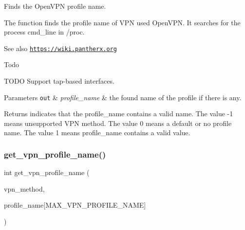 Finds the Open\+V\+PN profile name. 

The function finds the profile name of V\+PN used Open\+V\+PN. It searches for the process cmd\+\_\+line in /proc.

\begin{DoxySeeAlso}{See also}
\href{https://wiki.pantherx.org}{\tt https\+://wiki.\+pantherx.\+org} 
\end{DoxySeeAlso}
\begin{DoxyRefDesc}{Todo}
\item[\hyperlink{todo__todo000001}{Todo}]T\+O\+DO Support tap-\/based interfaces.\end{DoxyRefDesc}



\begin{DoxyParams}[1]{Parameters}
\mbox{\tt out}  & {\em profile\+\_\+name} & the found name of the profile if there is any. \\
\hline
\end{DoxyParams}
\begin{DoxyReturn}{Returns}
indicates that the profile\+\_\+name contains a valid name. The value -\/1 means unsupported V\+PN method. The value 0 means a default or no profile name. The value 1 means profile\+\_\+name contains a valid value. 
\end{DoxyReturn}
\mbox{\label{app-profile_8c_aa32bea11cb1c8f99a45bc62cc8f5e455}} 
\subsubsection{\texorpdfstring{get\+\_\+vpn\+\_\+profile\+\_\+name()}{get\_vpn\_profile\_name()}}
{\footnotesize\ttfamily int get\+\_\+vpn\+\_\+profile\+\_\+name (\begin{DoxyParamCaption}\item[{enum \hyperlink{route-tree_8h_a5b876670828c4e38106ba1c6d91024b7}{V\+P\+N\+\_\+\+M\+E\+T\+H\+O\+DS}}]{vpn\+\_\+method,  }\item[{char}]{profile\+\_\+name\mbox{[}\+M\+A\+X\+\_\+\+V\+P\+N\+\_\+\+P\+R\+O\+F\+I\+L\+E\+\_\+\+N\+A\+M\+E\mbox{]} }\end{DoxyParamCaption})}



